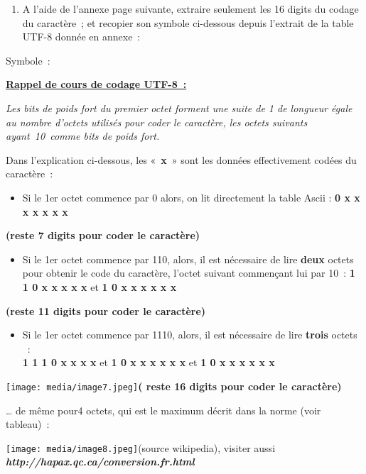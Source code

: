\begin{longtable}[]{@{}llllllllllllllllllllllllll@{}}
\toprule
\endhead
& & & & & & & & & & & & & & & & & & & & & & & & &\tabularnewline
\bottomrule
\end{longtable}

\begin{enumerate}
\def\labelenumi{\arabic{enumi}.}
\setcounter{enumi}{8}
\item
  A l'aide de l'annexe page suivante, extraire seulement les 16 digits
  du codage du caractère~; et recopier son symbole ci-dessous depuis
  l'extrait de la table UTF-8 donnée en annexe~:
\end{enumerate}

Symbole~:

\textbf{\underline{Rappel de cours de codage UTF-8~:}}

\emph{Les bits de poids fort du premier octet forment une suite de 1 de
longueur égale au nombre d'octets utilisés pour coder le caractère, les
octets suivants ayant~10~comme bits de poids fort.}

Dans l'explication ci-dessous, les «~\textbf{x}~» sont les données
effectivement codées du caractère~:

\begin{itemize}
\item
  Si le 1er octet commence par 0 alors, on lit directement la table
  Ascii : \textbf{0 x x x x x x x}
\end{itemize}

\textbf{(reste 7 digits pour coder le caractère)}

\begin{itemize}
\item
  Si le 1er octet commence par 110, alors, il est nécessaire de lire
  \textbf{deux} octets pour obtenir le code du caractère, l'octet
  suivant commençant lui par 10~: \textbf{1 1 0 x x x x x} et \textbf{1
  0 x x x x x x}
\end{itemize}

\textbf{(reste 11 digits pour coder le caractère)}

\begin{itemize}
\item
  Si le 1er octet commence par 1110, alors, il est nécessaire de lire
  \textbf{trois} octets ~:\\
  \textbf{1 1 1 0 x x x x} et \textbf{1 0 x x x x x x} et \textbf{1 0 x
  x x x x x}
\end{itemize}

\texttt{[image: media/image7.jpeg]}\textbf{(
reste 16 digits pour coder le caractère)}

\ldots{} de même pour4 octets, qui est le maximum décrit dans la norme
(voir tableau)~:

\texttt{[image: media/image8.jpeg]}(source wikipedia), visiter aussi
\emph{\textbf{http://hapax.qc.ca/conversion.fr.html}}